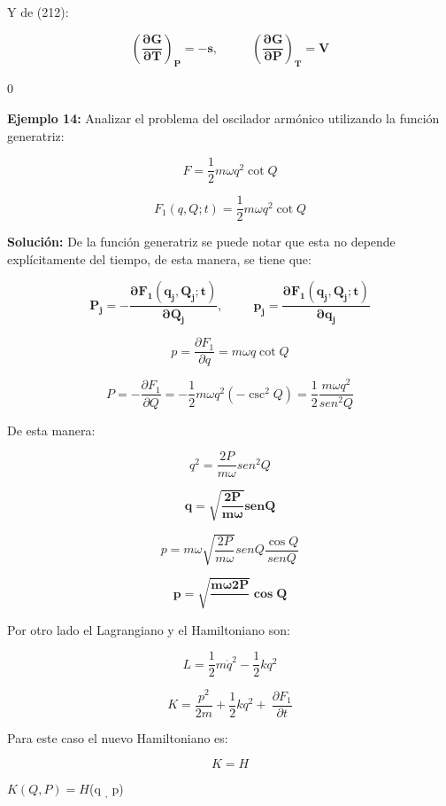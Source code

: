 \documentclass[]{article}
\begin{document}
Y de (212):

\[\left( \frac{\mathbf{\partial G}}{\mathbf{\partial T}} \right)_{\mathbf{P}}\mathbf{= - s,\ \ \ \ \ \ \ \ \ \ \ \ }\left( \frac{\mathbf{\partial G}}{\mathbf{\partial P}} \right)_{\mathbf{T}}\mathbf{= V}\]

0

\textbf{Ejemplo 14:} Analizar el problema del oscilador armónico
utilizando la función generatriz:

\[F = \frac{1}{2}m\omega q^{2}\cot Q\]

\[F_{1}(q,Q;t) = \frac{1}{2}m\omega q^{2}\cot Q\]

\textbf{Solución:} De la función generatriz se puede notar que esta no
depende explícitamente del tiempo, de esta manera, se tiene que:

\[\mathbf{P}_{\mathbf{j}}\mathbf{= -}\frac{\mathbf{\partial}\mathbf{F}_{\mathbf{1}}\left( \mathbf{q}_{\mathbf{j}}\mathbf{,}\mathbf{Q}_{\mathbf{j}}\mathbf{;t} \right)}{\mathbf{\partial}\mathbf{Q}_{\mathbf{j}}}\mathbf{,\ \ \ \ \ \ \ \ \ \ \ }\mathbf{p}_{\mathbf{j}}\mathbf{=}\frac{\mathbf{\partial}\mathbf{F}_{\mathbf{1}}\left( \mathbf{q}_{\mathbf{j}}\mathbf{,}\mathbf{Q}_{\mathbf{j}}\mathbf{;t} \right)}{\mathbf{\partial}\mathbf{q}_{\mathbf{j}}}\]

\[p = \frac{\partial F_{1}}{\partial q} = m\omega q\cot Q\]

\[P = - \frac{\partial F_{1}}{\partial Q} = - \frac{1}{2}m\omega q^{2}\left( {- \csc^{2}}Q \right) = \frac{1}{2}\frac{m\omega q^{2}}{{sen}^{2}Q}\]

De esta manera:

\[q^{2} = \frac{2P}{m\omega}{sen}^{2}Q\]

\[\mathbf{q =}\sqrt{\frac{\mathbf{2}\mathbf{P}}{\mathbf{m\omega}}}\mathbf{sen}\mathbf{Q}\]

\[p = m\omega\sqrt{\frac{2P}{m\omega}}{sen}Q\frac{\cos Q}{{sen}Q}\]

\[\mathbf{p =}\sqrt{\frac{\mathbf{m\omega}\mathbf{2}\mathbf{P}}{}}\mathbf{\cos}\mathbf{Q}\]

Por otro lado el Lagrangiano y el Hamiltoniano son:

\[L = \frac{1}{2}m{\dot{q}}^{2} - \frac{1}{2}kq^{2}\]

\[K = \frac{p^{2}}{2m} + \frac{1}{2}kq^{2} + \ \frac{\partial F_{1}}{\partial t}\]

Para este caso el nuevo Hamiltoniano es:

\[K = H\]

\(K(Q,P) = H\)(q \textsubscript{,} p)
\end{document}
